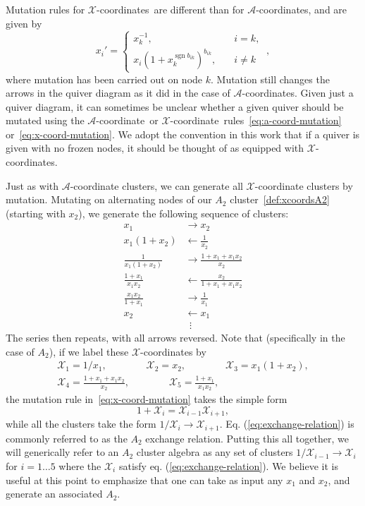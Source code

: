 \documentclass[12pt]{article}
\DeclareMathOperator{\sgn}{sgn}
\def\nl{\nonumber\\}
\def\nn{\nonumber}
\def\x{\mathcal{X}}
\def\xcoord{$\mathcal{X}$-coordinate}
\def\xcoords{$\mathcal{X}$-coordinates}
\def\a{\mathcal{A}}
\def\acoord{$\mathcal{A}$-coordinate}
\def\acoords{$\mathcal{A}$-coordinates}
\begin{document}
Mutation rules for \xcoords\ are different than for \acoords, and are given by
\begin{equation}
  \label{eq:x-coord-mutation}
  x_{i}' =
  \begin{cases}
    x_{k}^{-1}, &\quad i=k,\\
    x_{i} (1+x_{k}^{\sgn b_{i k}})^{b_{i k}}, &\quad i \neq k
  \end{cases}\ ,
\end{equation}
where mutation has been carried out on node $k$. Mutation still changes the arrows in the quiver diagram as it did in the case of \acoords.  Given just a quiver diagram, it can sometimes be unclear whether a given quiver should be mutated using the \acoord\ or \xcoord\ rules~\eqref{eq:a-coord-mutation} or~\eqref{eq:x-coord-mutation}. We adopt the convention in this work that if a quiver is given with no frozen nodes, it should be thought of as equipped with \xcoords.

Just as with $\a$-coordinate clusters, we can generate all $\x$-coordinate clusters by mutation. Mutating on alternating nodes of our $A_2$ cluster~\eqref{def:xcoordsA2} (starting with $x_2$), we generate the following sequence of clusters:
\begin{align}
  x_1 &\to x_2 \nl
  x_1(1+x_2) &\leftarrow \frac{1}{x_2} \nl
  \frac{1}{x_1(1+x_2)} &\to \frac{1+x_1+x_1 x_2}{x_2} \\
  \frac{1+x_1}{x_1 x_2} &\leftarrow \frac{x_2}{1+x_1+x_1 x_2} \nl
  \frac{x_1 x_2}{1+x_1} &\to \frac{1}{x_1} \nl
  x_2 &\leftarrow x_1 \nl
  &\ \ \vdots \nn
\end{align}
The series then repeats, with all arrows reversed. Note that (specifically in the case of $A_2$), if we label these $\x$-coordinates by
\begin{gather}\label{def:a2-xcoords}
  \x_1 = 1/x_1, \qquad \qquad \x_2 = x_2, \qquad \qquad \x_3 = x_1(1+x_2), \\ 
  \x_4 = \frac{1+x_1+x_1 x_2}{x_2}, \qquad \qquad \x_5 = \frac{1+x_1}{x_1 x_2}, \nonumber
\end{gather}
the mutation rule in~\eqref{eq:x-coord-mutation} takes the simple form
\begin{equation}\label{eq:exchange-relation}
  1+\x_i = \x_{i-1}\x_{i+1},
\end{equation}
while all the clusters take the form $1/\x_i \to \x_{i+1}$. Eq. (\ref{eq:exchange-relation}) is commonly referred to as the $A_2$ exchange relation. 
Putting this all together, we will generically refer to an $A_2$ cluster algebra as any set of clusters $1/\x_{i-1} \to \x_i$ for $i=1\ldots5$ where the $\x_i$ satisfy eq. (\ref{eq:exchange-relation}). We believe it is useful at this point to emphasize that one can take as input any $x_1$ and $x_2$, and generate an associated $A_2$. 
\end{document}
